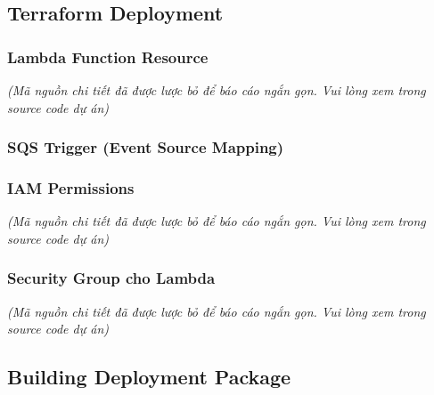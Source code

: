 \hypertarget{terraform-deployment}{%
\subsection{Terraform Deployment}}

\hypertarget{lambda-function-resource}{%
\subsubsection{Lambda Function
Resource}}

\emph{(Mã nguồn chi tiết đã được lược bỏ để báo cáo ngắn gọn. Vui lòng
xem trong source code dự án)}

\hypertarget{sqs-trigger-event-source-mapping}{%
\subsubsection{SQS Trigger (Event Source
Mapping)}}

\begin{Shaded}
\begin{Highlighting}[]
\NormalTok{\}}
\end{Highlighting}
\end{Shaded}

\hypertarget{iam-permissions}{%
\subsubsection{IAM Permissions}}

\emph{(Mã nguồn chi tiết đã được lược bỏ để báo cáo ngắn gọn. Vui lòng
xem trong source code dự án)}

\hypertarget{security-group-cho-lambda}{%
\subsubsection{Security Group cho
Lambda}}

\emph{(Mã nguồn chi tiết đã được lược bỏ để báo cáo ngắn gọn. Vui lòng
xem trong source code dự án)}

\hypertarget{building-deployment-package}{%
\subsection{Building Deployment
Package}}

